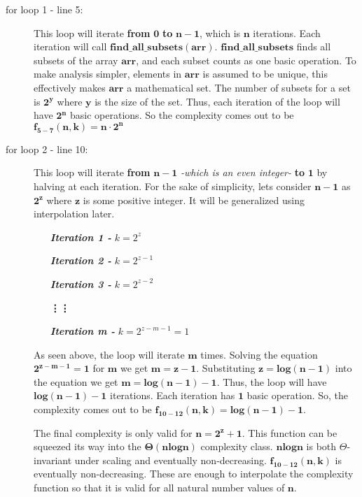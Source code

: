 \documentclass{article}
\begin{document}
\begin{description}
   \item[for loop 1 - line 5:] This loop will iterate \textbf{from} $\mathbf{0}$ \textbf{to} $\mathbf{n-1}$, which is $\mathbf{n}$ iterations. Each iteration will call $\mathbf{find\_all\_subsets(arr)}$. $\mathbf{find\_all\_subsets}$ finds all subsets of the array $\mathbf{arr}$, and each subset counts as one basic operation. To make analysis simpler, elements in $\mathbf{arr}$ is assumed to be unique, this effectively makes $\mathbf{arr}$ a mathematical set. The number of subsets for a set is $\mathbf{2^{y}}$ where $\mathbf{y}$ is the size of the set. Thus, each iteration of the loop will have $\mathbf{2^{n}}$ basic operations. So the complexity comes out to be $\mathbf{f_{5-7}(n,k) = n \cdot 2^{n}}$
   
   \item[for loop 2 - line 10:] This loop will iterate \textbf{from} $\mathbf{n-1}$ \textit{-which is an even integer-} \textbf{to} $\mathbf{1}$ by halving at each iteration. For the sake of simplicity, lets consider $\mathbf{n-1}$ as $\mathbf{2^{z}}$ where $\mathbf{z}$ is some positive integer. It will be generalized using interpolation later.
   
   \begin{enumerate}[leftmargin=3cm]
       \item[\textit{\textbf{Iteration 1 -}}] ${k = 2^{z}}$
       \item[\textit{\textbf{Iteration 2 -}}] ${k = 2^{z-1}}$
       \item[\textit{\textbf{Iteration 3 -}}] ${k = 2^{z-2}}$
       \item[]\hspace{-1.5cm}\textbf{\vdots}\hspace{2cm}\textbf{\vdots}
       \item[\textit{\textbf{Iteration m -}}] ${k = 2^{z-m-1} = 1}$
   \end{enumerate}
   
   As seen above, the loop will iterate $\mathbf{m}$ times. Solving the equation $\mathbf{2^{z-m-1} = 1}$ for $\mathbf{m}$ we get $\mathbf{m = z - 1}$. Substituting $\mathbf{z = log(n-1)}$ into the equation we get $\mathbf{m = log(n-1) - 1}$. Thus, the loop will have $\mathbf{log(n-1) - 1}$ iterations. Each iteration has $\mathbf{1}$ basic operation. So, the complexity comes out to be $\mathbf{f_{10-12}(n,k) = log(n-1) - 1}$. \par
   The final complexity is only valid for $\mathbf{n = 2^{z} + 1}$. This function can be squeezed its way into the $\mathbf{\Theta (n log n)}$ complexity class. $\mathbf{n log n}$ is both $\Theta$-invariant under scaling and eventually non-decreasing. $\mathbf{f_{10-12}(n,k)}$ is eventually non-decreasing. These are enough to interpolate the complexity function so that it is valid for all natural number values of $\mathbf{n}$.
   

\end{description}
\end{document}
